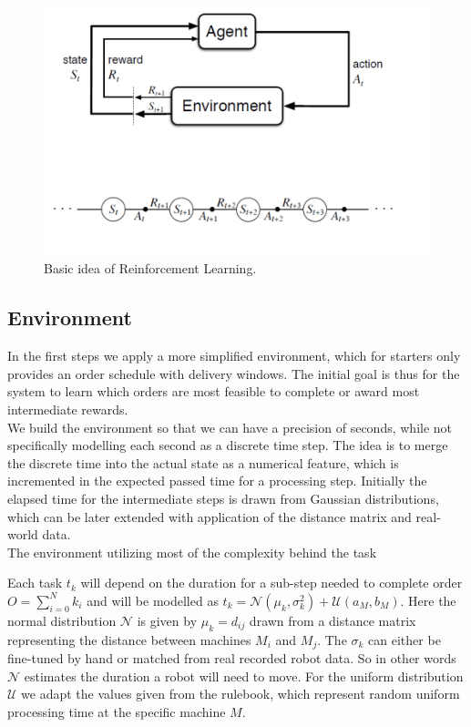 \documentclass[runningheads,envcountsect]{llncs}
\begin{document}
\begin{figure}[h!]
  \centering
  \includegraphics[scale=0.7]{img/rl_base.png}
  \caption{Basic idea of Reinforcement Learning.}
  \label{fig:rl}
\end{figure}


\subsection{Environment} \label{env}
In the first steps we apply a more simplified environment, which for starters only provides an order schedule with delivery windows. The initial goal is thus for the system to learn which orders are most feasible to complete or award most intermediate rewards.\\
We build the environment so that we can have a precision of seconds, while not specifically modelling each second as a discrete time step. The idea is to merge the discrete time into the actual state as a numerical feature, which is incremented in the expected passed time for a processing step. Initially the elapsed time for the intermediate steps is drawn from Gaussian distributions, which can be later extended with application of the distance matrix and real-world data.\\
The environment utilizing most of the complexity behind the task 

Each task $t_k$ will depend on the duration for a sub-step needed to complete order $O=\sum_{i=0}^N k_i$ and will be modelled as $t_k = \mathcal{N}(\mu_k, \sigma_k^2) + \mathcal{U}(a_M,b_M)$. Here the normal distribution $\mathcal{N}$ is given by $\mu_k=d_{ij}$ drawn from a distance matrix representing the distance between machines $M_i$ and $M_j$. The $\sigma_k$ can either be fine-tuned by hand or matched from real recorded robot data. So in other words $\mathcal{N}$ estimates the duration a robot will need to move. For the uniform distribution $\mathcal{U}$ we adapt the values given from the rulebook, which represent random uniform processing time at the specific machine $M$.
\end{document}

